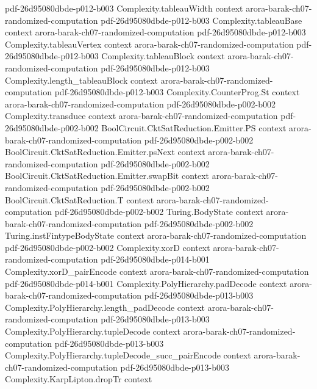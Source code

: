\begin{theorem}
  {pdf-26d95080dbde-p012-b003}
\proofstep
  {Complexity.tableauWidth}
  {context}
  {arora-barak-ch07-randomized-computation}
  {pdf-26d95080dbde-p012-b003}
\proofstep
  {Complexity.tableauBase}
  {context}
  {arora-barak-ch07-randomized-computation}
  {pdf-26d95080dbde-p012-b003}
\proofstep
  {Complexity.tableauVertex}
  {context}
  {arora-barak-ch07-randomized-computation}
  {pdf-26d95080dbde-p012-b003}
\proofstep
  {Complexity.tableauBlock}
  {context}
  {arora-barak-ch07-randomized-computation}
  {pdf-26d95080dbde-p012-b003}
\proofstep
  {Complexity.length_tableauBlock}
  {context}
  {arora-barak-ch07-randomized-computation}
  {pdf-26d95080dbde-p012-b003}
\proofstep
  {Complexity.CounterProg.St}
  {context}
  {arora-barak-ch07-randomized-computation}
  {pdf-26d95080dbde-p002-b002}
\proofstep
  {Complexity.transduce}
  {context}
  {arora-barak-ch07-randomized-computation}
  {pdf-26d95080dbde-p002-b002}
\proofstep
  {BoolCircuit.CktSatReduction.Emitter.PS}
  {context}
  {arora-barak-ch07-randomized-computation}
  {pdf-26d95080dbde-p002-b002}
\proofstep
  {BoolCircuit.CktSatReduction.Emitter.psNext}
  {context}
  {arora-barak-ch07-randomized-computation}
  {pdf-26d95080dbde-p002-b002}
\proofstep
  {BoolCircuit.CktSatReduction.Emitter.swapBit}
  {context}
  {arora-barak-ch07-randomized-computation}
  {pdf-26d95080dbde-p002-b002}
\proofstep
  {BoolCircuit.CktSatReduction.T}
  {context}
  {arora-barak-ch07-randomized-computation}
  {pdf-26d95080dbde-p002-b002}
\proofstep
  {Turing.BodyState}
  {context}
  {arora-barak-ch07-randomized-computation}
  {pdf-26d95080dbde-p002-b002}
\proofstep
  {Turing.instFintypeBodyState}
  {context}
  {arora-barak-ch07-randomized-computation}
  {pdf-26d95080dbde-p002-b002}
\proofstep
  {Complexity.xorD}
  {context}
  {arora-barak-ch07-randomized-computation}
  {pdf-26d95080dbde-p014-b001}
\proofstep
  {Complexity.xorD_pairEncode}
  {context}
  {arora-barak-ch07-randomized-computation}
  {pdf-26d95080dbde-p014-b001}
\proofstep
  {Complexity.PolyHierarchy.padDecode}
  {context}
  {arora-barak-ch07-randomized-computation}
  {pdf-26d95080dbde-p013-b003}
\proofstep
  {Complexity.PolyHierarchy.length_padDecode}
  {context}
  {arora-barak-ch07-randomized-computation}
  {pdf-26d95080dbde-p013-b003}
\proofstep
  {Complexity.PolyHierarchy.tupleDecode}
  {context}
  {arora-barak-ch07-randomized-computation}
  {pdf-26d95080dbde-p013-b003}
\proofstep
  {Complexity.PolyHierarchy.tupleDecode_succ_pairEncode}
  {context}
  {arora-barak-ch07-randomized-computation}
  {pdf-26d95080dbde-p013-b003}
\proofstep
  {Complexity.KarpLipton.dropTr}
  {context}

\end{theorem}
